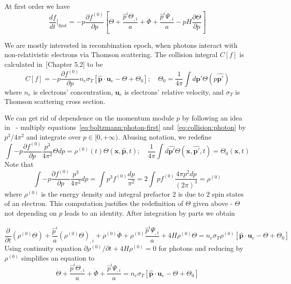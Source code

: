 \documentclass[12pt]{extarticle}
\numberwithin{problem}{section}
\numberwithin{theorem}{section}
\begin{document}
	At first order we have
	\begin{equation}
		\label{eq:boltzmann:photon-first}
		\frac{df}{dt}\Big\lvert_{\text{first}} = -p\frac{\partial f^{(0)}}{\partial p}\left[\dot{\Theta} + \frac{\hat{p}^i\Theta_{,i}}{a} + \dot{\Phi} + \frac{\hat{p}^i\Psi_{,i}}{a} - pH\frac{\partial\Theta}{\partial p}\right]
	\end{equation}

	We are mostly interested in recombination epoch, when photons interact with non-relativistic electrons via Thomson scattering. The collision integral $C[f]$ is calculated in~\cite{dodelson:2003}[Chapter 5.2] to be
	\begin{equation}
		\label{eq:collision:photon}
		C[f] = -p\frac{\partial f^{(0)}}{\partial p}n_e\sigma_T\left[\mathbf{\hat{p}}\cdot\mathbf{u}_e - \Theta + \Theta_0\right];\quad \Theta_0 = \frac{1}{4\pi}\int d\mathbf{\hat{p'}}\Theta(p\mathbf{\hat{p'}})
	\end{equation}
	where $n_e$ is electrons' concentration, $\mathbf{u}_e$ is electrons' relative velocity, and $\sigma_T$ is Thomson scattering cross section.

	We can get rid of dependence on the momentum module $p$ by following an idea in~\cite{ma:1995} - multiply equations~\ref{eq:boltzmann:photon-first} and~\ref{eq:collision:photon} by $p^3/4\pi^2$ and integrate over $p\in[0,+\infty)$. Abusing notation, we redefine 
	\begin{equation}
		\label{eq:redef:theta}
		\int -p\frac{\partial f^{(0)}}{\partial p}\frac{p^3}{4\pi^2}\Theta dp = \rho^{(0)}(t)\Theta(\mathbf{x},\mathbf{\hat{p}}, t);\quad \frac{1}{4\pi}\int d\mathbf{\hat{p'}}\Theta(\mathbf{x}, \mathbf{\hat{p'}}, t) = \Theta_0(\mathbf{x}, t)
	\end{equation}
	Note that
	\begin{equation}
		\int -p\frac{\partial f^{(0)}}{\partial p}\frac{p^3}{4\pi^2} dp = \int p^3 f^{(0)} \frac{dp}{\pi^2} = 2\int pf^{(0)} \frac{4\pi p^2 dp}{(2\pi)^3} = \rho^{(0)}
	\end{equation}
	where $\rho^{(0)}$ is the energy density and integral prefactor 2 is due to 2 spin states of an electron. This computation justifies the redefinition of $\Theta$ given above - $\Theta$ not depending on $p$ leads to an identity. After integration by parts we obtain
	
	\begin{equation}
		\frac{\partial}{\partial t}(\rho^{(0)}\Theta) + \frac{\hat{p}^i}{a}(\rho^{(0)}\Theta)_{,i} + \rho^{(0)}\dot{\Phi} + \rho^{(0)}\frac{\hat{p}^i\Psi_{,i}}{a} + 4H\rho^{(0)}\Theta = n_e\sigma_T\rho^{(0)}[\mathbf{\hat{p}}\cdot\mathbf{u}_e - \Theta + \Theta_0]
	\end{equation}
	Using continuity equation $\partial \rho^{(0)}/\partial t + 4H\rho^{(0)} = 0$ for photons and reducing by $\rho^{(0)}$ simplifies an equation to
	\begin{equation}
		\dot{\Theta} + \frac{\hat{p}^i\Theta_{,i}}{a} + \dot{\Phi} + \frac{\hat{p}^i\Psi_{,i}}{a} = n_e\sigma_T[\mathbf{\hat{p}}\cdot\mathbf{u}_e - \Theta + \Theta_0]
	\end{equation}
\end{document}
